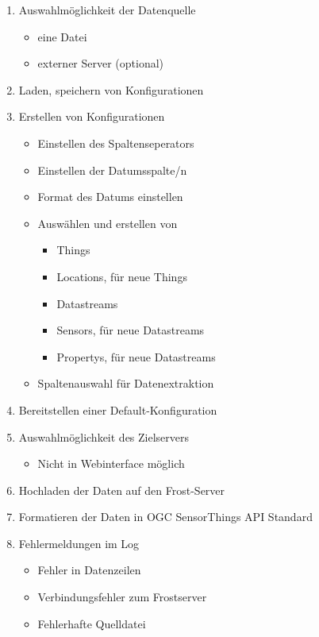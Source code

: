 \documentclass[a4paper, 12 pt]{article}
\begin{document}
	\begin{enumerate}
		\item Auswahlmöglichkeit der Datenquelle
		\begin{itemize}
			\item eine Datei
			\item externer Server (optional)
		\end{itemize}
		
		\item Laden, speichern von Konfigurationen
		
		\item Erstellen von Konfigurationen
		\begin{itemize}
			\item Einstellen des Spaltenseperators
			\item Einstellen der Datumsspalte/n
			\item Format des Datums einstellen
			\item Auswählen und erstellen von
			\begin{itemize}
				\item Things
				\item Locations, für neue Things
				\item Datastreams
				\item Sensors, für neue Datastreams
				\item Propertys, für neue Datastreams
			\end{itemize}
			\item Spaltenauswahl für Datenextraktion
		\end{itemize}
		
		\item Bereitstellen einer Default-Konfiguration
		
		\item Auswahlmöglichkeit des Zielservers
		\begin{itemize}
			\item Nicht in Webinterface möglich
		\end{itemize}
		
		\item Hochladen der Daten auf den Frost-Server
		
		\item Formatieren der Daten in OGC SensorThings API Standard
		
		\item Fehlermeldungen im Log
		\begin{itemize}
			\item Fehler in Datenzeilen
			\item Verbindungsfehler zum Frostserver
			\item Fehlerhafte Quelldatei
		\end{itemize}
		

\end{enumerate}
\end{document}
